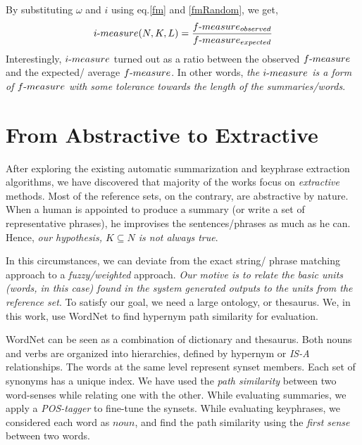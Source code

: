 \documentclass{sig-alternate-05-2015}
\begin{document}
By substituting $\omega$ and $i$ using eq.\ref{fm} and \ref{fmRandom}, we get,
\begin{equation}
i\hbox{-}measure(N,K,L) = \frac{f\hbox{-}measure_{observed}}{f\hbox{-}measure_{expected}}
\end{equation}
Interestingly, $i\hbox{-}measure$ turned out as a ratio between the observed $f\hbox{-}measure$ and the expected/ average $f\hbox{-}measure$. In other words, \emph{the $i\hbox{-}measure$ is a form of $f\hbox{-}measure$ with some tolerance towards the length of the summaries/words}.

\section{From Abstractive to Extractive}
After exploring the existing automatic summarization and keyphrase extraction algorithms, we have discovered that majority of the works focus on \emph{extractive} methods. 
Most of the reference sets, on the contrary, are abstractive by nature. When a human is appointed to produce a summary (or write a set of representative phrases), he improvises the sentences/phrases as much as he can. Hence, \emph{our hypothesis, $K \subseteq N$ is not always true}. 
\par In this circumstances, we can deviate from the exact string/ phrase matching approach to a \emph{fuzzy/weighted} approach. \emph{Our motive is to relate the basic units (words, in this case) found in the system generated outputs to the units from the reference set}. To satisfy our goal, we need a large ontology, or thesaurus. We, in this work, use WordNet to find hypernym path similarity for evaluation.
\par %
WordNet can be seen as a combination of dictionary and thesaurus. Both nouns and verbs are organized into hierarchies, defined by hypernym or \emph{IS-A} relationships. The words at the same level represent synset members. Each set of synonyms has a unique index. We have used the \emph{path similarity} between two word-senses while relating one with the other. While evaluating summaries, we apply a \emph{POS-tagger} to fine-tune the synsets. While evaluating keyphrases, we considered each word as $noun$, and find the path similarity using the \emph{first sense} between two words.
\end{document}
